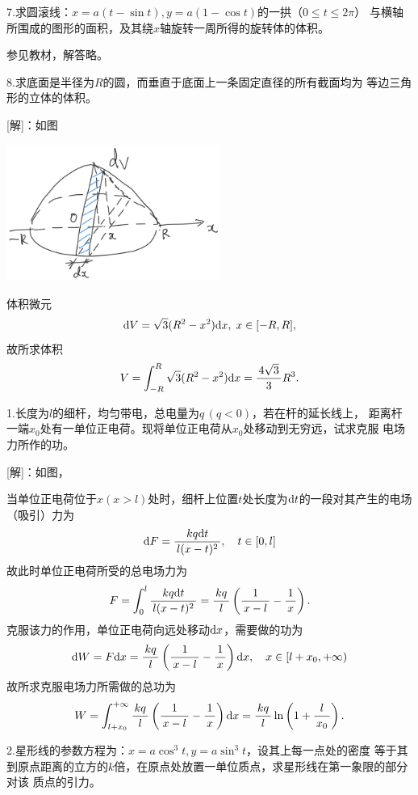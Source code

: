 \bs

7.求圆滚线：$x=a(t-\sin t),y=a(1-\cos t)$的一拱（$0\leq t\leq 2\pi$）
与横轴所围成的图形的面积，及其绕$x$轴旋转一周所得的旋转体的体积。

参见教材，解答略。

8.求底面是半径为$R$的圆，而垂直于底面上一条固定直径的所有截面均为
等边三角形的立体的体积。

[解]：如图
\begin{center}
	\includegraphics[width=7cm]{./images/ch6/rtSp.jpg}
\end{center}
体积微元
$$\d V=\sqrt3(R^2-x^2)\d x,\;x\in[-R,R],$$
故所求体积
$$V=\dint_{-R}^R\sqrt3(R^2-x^2)\d x=\df{4\sqrt3}3R^3.$$
\fin

\bs

1.长度为$l$的细杆，均匀带电，总电量为$q\,(q<0)$，若在杆的延长线上，
距离杆一端$x_0$处有一单位正电荷。现将单位正电荷从$x_0$处移动到无穷远，试求克服
电场力所作的功。

[解]：如图，
\begin{center}
\end{center}
当单位正电荷位于$x(x>l)$处时，细杆上位置$t$处长度为$\d t$的一段对其产生的电场（吸引）力为
$$\d F=\df{kq\d t}{l(x-t)^2},\quad t\in[0,l]$$
故此时单位正电荷所受的总电场力为
$$F=\dint_0^l\df{kq\d t}{l(x-t)^2}=\df{kq}l\left(\df1{x-l}-\df1x\right).$$
克服该力的作用，单位正电荷向远处移动$\d x$，需要做的功为
$$\d W=F\d x=\df{kq}l\left(\df1{x-l}-\df1x\right)\d x,
\quad x\in[l+x_0,+\infty)$$
故所求克服电场力所需做的总功为
$$W=\dint_{l+x_0}^{+\infty}\df{kq}l\left(\df1{x-l}-\df1x\right)\d x
=\df{kq}l\ln\left(1+\df{l}{x_0}\right).$$
\fin

\bs

2.星形线的参数方程为：$x=a\cos^3t,y=a\sin^3t$，设其上每一点处的密度
等于其到原点距离的立方的$k$倍，在原点处放置一单位质点，求星形线在第一象限的部分对该
质点的引力。

